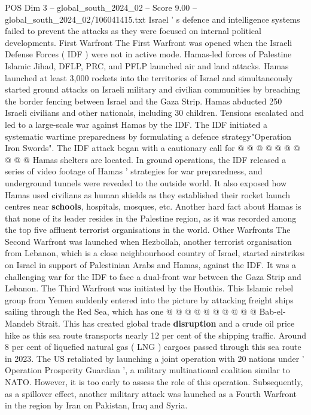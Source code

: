 \begin{textsample}{POS Dim 3 – global\_south\_2024\_02 – Score 9.00 – global\_south\_2024\_02/106041415.txt}
Israel ' s defence and intelligence systems failed to prevent the attacks as they were focused on internal political developments.
First Warfront The First Warfront was opened when the Israeli Defense Forces ( IDF ) were not in active mode.
Hamas-led forces of Palestine Islamic Jihad, DFLP, PRC, and PFLP launched air and land attacks.
Hamas launched at least 3,000 rockets into the territories of Israel and simultaneously started ground attacks on Israeli military and civilian communities by breaching the border fencing between Israel and the Gaza Strip.
Hamas abducted 250 Israeli civilians and other nationals, including 30 children.
Tensions escalated and led to a large-scale war against Hamas by the IDF.
The IDF initiated a systematic wartime preparedness by formulating a defence strategy"Operation Iron Swords".
The IDF attack began with a cautionary call for @ @ @ @ @ @ @ @ @ @ Hamas shelters are located.
In ground operations, the IDF released a series of video footage of Hamas ' strategies for war preparedness, and underground tunnels were revealed to the outside world.
It also exposed how Hamas used civilians as human shields as they established their rocket launch centres near \textbf{schools}, hospitals, mosques, etc.
Another hard fact about Hamas is that none of its leader resides in the Palestine region, as it was recorded among the top five affluent terrorist organisations in the world.
Other Warfronts The Second Warfront was launched when Hezbollah, another terrorist organisation from Lebanon, which is a close neighbourhood country of Israel, started airstrikes on Israel in support of Palestinian Arabs and Hamas, against the IDF.
It was a challenging war for the IDF to face a dual-front war between the Gaza Strip and Lebanon.
The Third Warfront was initiated by the Houthis.
This Islamic rebel group from Yemen suddenly entered into the picture by attacking freight ships sailing through the Red Sea, which has one @ @ @ @ @ @ @ @ @ @ Bab-el-Mandeb Strait.
This has created global trade \textbf{disruption} and a crude oil price hike as this sea route transports nearly 12 per cent of the shipping traffic.
Around 8 per cent of liquefied natural gas ( LNG ) cargoes passed through this sea route in 2023.
The US retaliated by launching a joint operation with 20 nations under ' Operation Prosperity Guardian ', a military multinational coalition similar to NATO.
However, it is too early to assess the role of this operation.
Subsequently, as a spillover effect, another military attack was launched as a Fourth Warfront in the region by Iran on Pakistan, Iraq and Syria.

\end{textsample}
